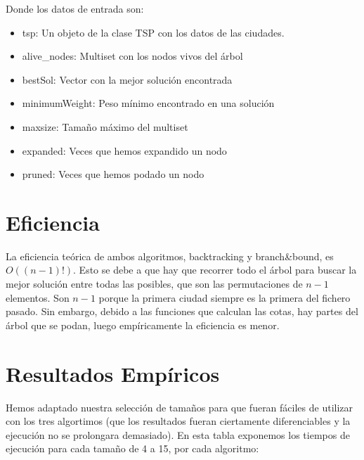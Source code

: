 \documentclass[a4]{article}
\begin{document}
Donde los datos de entrada son:
\begin{itemize}
\item tsp: Un objeto de la clase TSP con los datos de las ciudades.
\item alive\_nodes: Multiset con los nodos vivos del árbol
\item bestSol: Vector con la mejor solución encontrada
\item minimumWeight: Peso mínimo encontrado en una solución
\item maxsize: Tamaño máximo del multiset
\item expanded: Veces que hemos expandido un nodo
\item pruned: Veces que hemos podado un nodo
\end{itemize}

\section{Eficiencia}

La eficiencia teórica de ambos algoritmos, backtracking y branch\&bound, es $O((n-1)!)$. Esto se debe a que hay que recorrer todo el árbol para buscar la mejor solución entre todas las posibles, que son las permutaciones de $n-1$ elementos. Son $n-1$ porque la primera ciudad siempre es la primera del fichero pasado.
Sin embargo, debido a las funciones que calculan las cotas, hay partes del árbol que se podan, luego empíricamente la eficiencia es menor.

\section{Resultados Empíricos}

Hemos adaptado nuestra selección de tamaños para que fueran fáciles de utilizar con los tres algortimos (que los resultados fueran ciertamente diferenciables y la ejecución no se prolongara demasiado). En esta tabla exponemos los tiempos de ejecución para cada tamaño de 4 a 15, por cada algoritmo:
\end{document}
